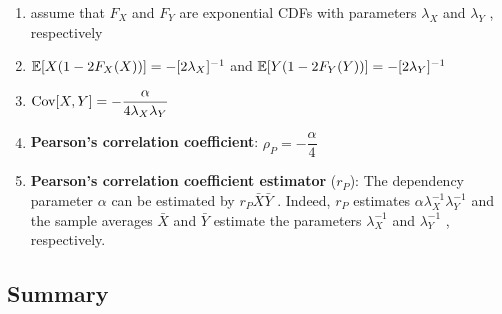 \begin{enumerate}
    \item assume that $F_X$ and $F_Y$ are exponential CDFs with parameters $\lambda_X$ and $\lambda_Y$ , respectively
    \hfill \cite{statistics/book/Statistics-for-Data-Scientists/Maurits-Kaptein}

    \item $\mathbb{E}[X (1 - 2F_X (X))] = -[2\lambda_X ]^{-1}$ and $\mathbb{E}[Y (1 - 2F_Y (Y ))] = -[2\lambda_Y ]^{-1}$
    \hfill \cite{statistics/book/Statistics-for-Data-Scientists/Maurits-Kaptein}

    \item $\text{Cov}[X, Y] = -\dfrac{\alpha}{4\lambda_X \lambda_Y} $
    \hfill \cite{statistics/book/Statistics-for-Data-Scientists/Maurits-Kaptein}

    \item \textbf{Pearson’s correlation coefficient}: $\rho_P = -\dfrac{\alpha}{4}$
    \hfill \cite{statistics/book/Statistics-for-Data-Scientists/Maurits-Kaptein}

    \item \textbf{Pearson’s correlation coefficient estimator} ($r_P$):
    The dependency parameter $\alpha$ can be estimated by $r_P \bar{X} \bar{Y}$ .
    Indeed, $r_P$ estimates $\alpha\lambda^{-1}_X \lambda^{-1}_Y$ and the sample averages $\bar{X}$ and $\bar{Y}$ estimate the parameters $\lambda^{-1}_X$ and $\lambda^{-1}_Y$ , respectively.
    \hfill \cite{statistics/book/Statistics-for-Data-Scientists/Maurits-Kaptein}
\end{enumerate}


\subsection{Summary}


